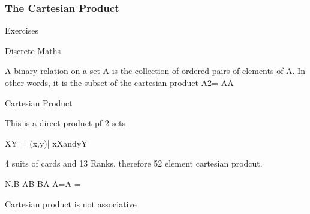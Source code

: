 \documentclass{beamer}
\begin{document}
\begin{frame}
\frametitle{The Cartesian Product}
Exercises
\end{frame}

 Discrete Maths
 
A binary relation on a set A is the collection of ordered pairs of elements of A. In other words, it is the subset of the cartesian product A2= AA

Cartesian Product
 
This is a direct product pf 2 sets
 
XY = {(x,y)| xXandyY }
 
4 suits of cards and 13 Ranks, therefore 52 element cartesian prodcut.
 
N.B         AB BA
              A=A =
 
Cartesian product is not associative
\end{document}
